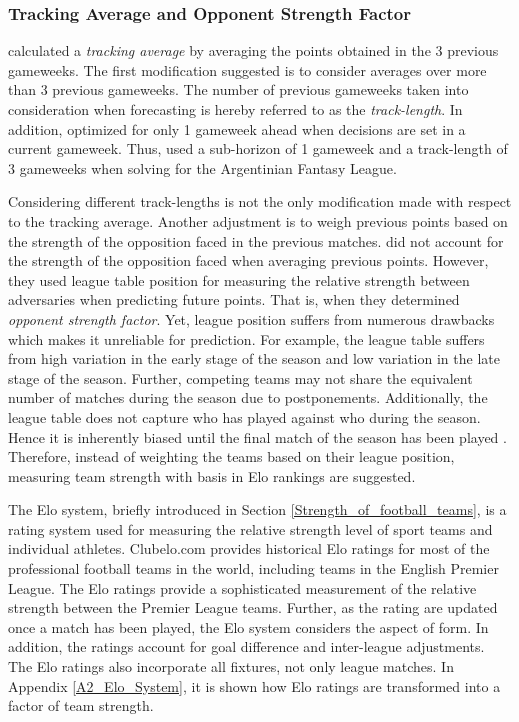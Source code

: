 \subsubsection{Tracking Average and Opponent Strength Factor}

\cite{Bonomo} calculated a \textit{tracking average} by averaging the points obtained in the 3 previous gameweeks. The first modification suggested is to consider averages over more than 3 previous gameweeks. The number of previous gameweeks taken into consideration when forecasting is hereby referred to as the \textit{track-length}. In addition, \cite{Bonomo} optimized for only 1 gameweek ahead when decisions are set in a current gameweek. Thus, \cite{Bonomo} used a sub-horizon of 1 gameweek and a track-length of 3 gameweeks when solving for the Argentinian Fantasy League.

\newpar

Considering different track-lengths is not the only modification made with respect to the tracking average. Another adjustment is to weigh previous points based on the strength of the opposition faced in the previous matches. \cite{Bonomo} did not account for the strength of the opposition faced when averaging previous points. However, they used league table position for measuring the relative strength between adversaries when predicting future points. That is, when they determined \textit{opponent strength factor}. Yet, league position suffers from numerous drawbacks which makes it unreliable for prediction. For example, the league table suffers from high variation in the early stage of the season and low variation in the late stage of the season. Further, competing teams may not share the equivalent number of matches during the season due to postponements. Additionally, the league table does not capture who has played against who during the season. Hence it is inherently biased until the final match of the season has been played \citep{Constantinou}. Therefore, instead of weighting the teams based on their league position, measuring team strength with basis in Elo rankings are suggested. 


\newpar

The Elo system, briefly introduced in Section \ref{Strength_of_football_teams}, is a rating system used for measuring the relative strength level of sport teams and individual athletes. Clubelo.com provides historical Elo ratings for most of the professional football teams in the world, including teams in the English Premier League. The Elo ratings provide a sophisticated measurement of the relative strength between the Premier League teams. Further, as the rating are updated once a match has been played, the Elo system considers the aspect of form. In addition, the ratings account for goal difference and inter-league adjustments. The Elo ratings also incorporate all fixtures, not only league matches. In Appendix \ref{A2_Elo_System}, it is shown how Elo ratings are transformed into a factor of team strength. 

